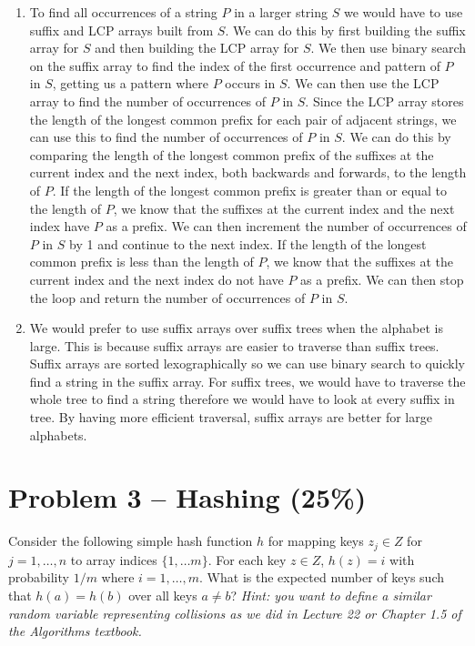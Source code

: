 \documentclass[12pt,letterpaper]{article}
\begin{document}
\begin{enumerate}
    \item To find all occurrences of a string $P$ in a larger string $S$ we would have to use suffix and LCP arrays built from $S$.
    We can do this by first building the suffix array for $S$ and then building the LCP array for $S$. 
    We then use binary search on the suffix array to find the index of the first occurrence and pattern of $P$ in $S$, getting us a pattern where $P$ occurs in $S$.
    We can then use the LCP array to find the number of occurrences of $P$ in $S$.
    Since the LCP array stores the length of the longest common prefix for each pair of adjacent strings, we can use this to find the number of occurrences of $P$ in $S$.
    We can do this by comparing the length of the longest common prefix of the suffixes at the current index and the next index, both backwards and forwards, to the length of $P$.
    If the length of the longest common prefix is greater than or equal to the length of $P$, we know that the suffixes at the current index and the next index have $P$ as a prefix.
    We can then increment the number of occurrences of $P$ in $S$ by 1 and continue to the next index.
    If the length of the longest common prefix is less than the length of $P$, we know that the suffixes at the current index and the next index do not have $P$ as a prefix.
    We can then stop the loop and return the number of occurrences of $P$ in $S$.
    \item We would prefer to use suffix arrays over suffix trees when the alphabet is large.
    This is because suffix arrays are easier to traverse than suffix trees.
    Suffix arrays are sorted lexographically so we can use binary search to quickly find a string in the suffix array.
    For suffix trees, we would have to traverse the whole tree to find a string therefore we would have to look at every suffix in tree.
    By having more efficient traversal, suffix arrays are better for large alphabets.
\end{enumerate}


\section*{Problem 3 -- Hashing (25\%)}
Consider the following simple hash function $h$ for mapping keys $z_j \in Z$ for $j=1,\dots ,n$ to array indices $\{1, \dots  m\}$.
For each key $z \in Z$, $h(z)=i$ with probability $1/m$ where $i=1, \dots , m$.
What is the expected number of keys such that $h(a)=h(b)$ over all keys $a \neq b$?
\textit{Hint: you want to define a similar random variable representing collisions as we did in Lecture 22 or Chapter 1.5 of the Algorithms textbook.}
\end{document}
